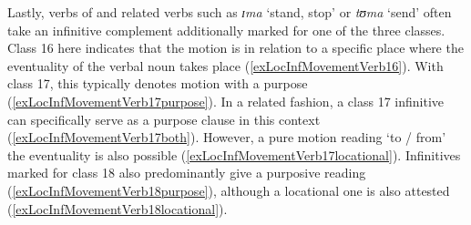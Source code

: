Lastly, verbs of  and related verbs such as \textit{ɪma} `stand, stop' or \textit{tʊma} \lq send' often take an infinitive complement additionally marked for one of the three  classes. Class 16 here indicates that the motion is in relation to a specific place where the eventuality of the verbal noun takes place (\ref{exLocInfMovementVerb16}). With class 17, this typically denotes motion with a purpose (\ref{exLocInfMovementVerb17purpose}). In a related fashion, a class 17 infinitive can specifically serve as a purpose clause in this context (\ref{exLocInfMovementVerb17both}). However, a pure motion reading \lq to / from' the eventuality is also possible (\ref{exLocInfMovementVerb17locational}). Infinitives marked for class 18 also predominantly give a purposive reading (\ref{exLocInfMovementVerb18purpose}), although a locational one is also attested (\ref{exLocInfMovementVerb18locational}).%
